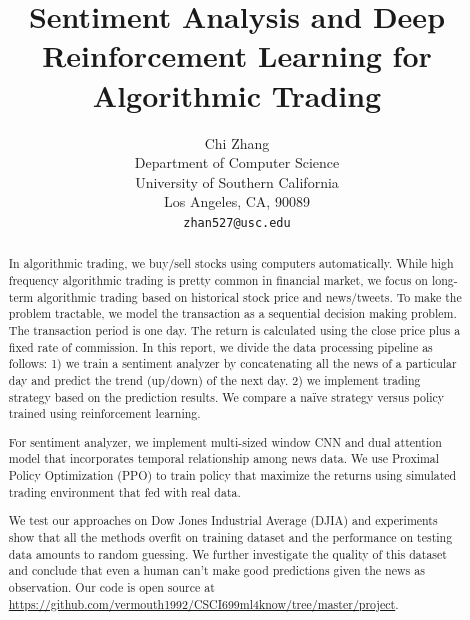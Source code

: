 \documentclass[11pt,a4paper]{article}
\title{Sentiment Analysis and Deep Reinforcement Learning for Algorithmic Trading}
\author{Chi Zhang \\
  Department of Computer Science \\
  University of Southern California \\
  Los Angeles, CA, 90089 \\
  \texttt{zhan527@usc.edu} \\}
\date{}
\begin{document}
\maketitle
\begin{abstract}
  In algorithmic trading, we buy/sell stocks using computers automatically. While high frequency algorithmic trading is pretty common in financial market, we focus on long-term algorithmic trading based on historical stock price and news/tweets. To make the problem tractable, we model the transaction as a sequential decision making problem. The transaction period is one day. The return is calculated using the close price plus a fixed rate of commission.
  In this report, we divide the data processing pipeline as follows: 1) we train a sentiment analyzer by concatenating all the news of a particular day and predict the trend (up/down) of the next day. 2) we implement trading strategy based on the prediction results. We compare a na\"ive strategy versus policy trained using reinforcement learning.
  
  For sentiment analyzer, we implement multi-sized window CNN and dual attention model that incorporates temporal relationship among news data.
  We use Proximal Policy Optimization (PPO) to train policy that maximize the returns using simulated trading environment that fed with real data.
  
  We test our approaches on Dow Jones Industrial Average (DJIA) and experiments show that all the methods overfit on training dataset and the performance on testing data amounts to random guessing. We further investigate the quality of this dataset and conclude that even a human can't make good predictions given the news as observation. Our code is open source at \url{https://github.com/vermouth1992/CSCI699ml4know/tree/master/project}.
\end{abstract}
\end{document}

